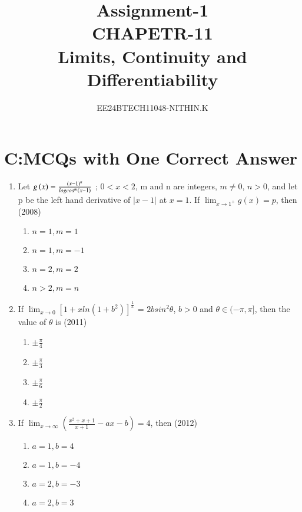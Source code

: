 \documentclass[journal,12pt,twocolumn]{IEEEtran}
\theoremstyle{remark}
\begin{document}


\title{Assignment-1\\CHAPETR-11\\Limits, Continuity and Differentiability}
\author{EE24BTECH11048-NITHIN.K} 
\maketitle
\newpage
\bigskip

\renewcommand{\thefigure}{\theenumi}
\renewcommand{\thetable}{\theenumi}


\section{C:MCQs with One Correct Answer}


\begin{enumerate}
	\item Let $g\left(x\right)= \frac{(x-1)^n}{logcos^m(x-1)}$ ; $0<x<2$, m and n are integers, $m\neq0$, $n>0$, and let p be the left hand derivative of $|x-1|$ at $x=1$. If $\lim_{x \to 1^+}{g(x)=p}$, then \hfill{(2008)} 

\begin{enumerate}[label=\alph*)]
    \item $n=1,m=1$
    \item $n=1,m=-1$
    \item $n=2,m=2$
    \item $n>2,m=n$ \\
\end{enumerate}
\item If $\lim_{x \to 0}[1+xln(1+b^2)]^\frac{1}{x}$ = $2bsin^2\theta$, $b>0$ and $\theta \in (-\pi,\pi]$, then the value of $\theta$ is 
\hfill{(2011)} 

\begin{enumerate}[label=\alph*)]
    \item $\pm\frac{\pi}{4}$
    \item $\pm\frac{\pi}{3}$
    \item $\pm\frac{\pi}{6}$
    \item $\pm\frac{\pi}{2}$ \\
\end{enumerate} 
\item If $\lim_{ x \to \infty}(\frac{x^2+x+1}{x+1}-ax-b) = 4$, then \hfill{(2012)} 

\begin{enumerate}[label=\alph*)]
    \item $a=1,b=4$
    \item $a=1,b=-4$
    \item $a=2,b=-3$
    \item $a=2,b=3$ \\
\end{enumerate}


\end{enumerate}
\end{document}
